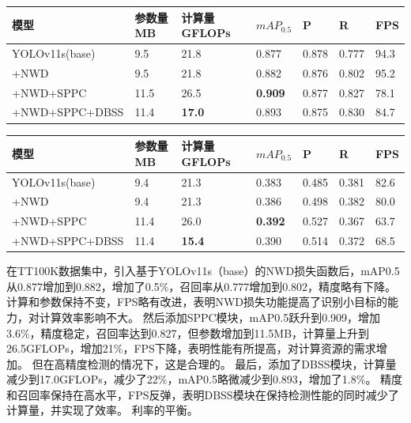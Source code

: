 \begin{table}[htbp]
    \centering
    \captionsetup{font=footnotesize}
    \label{tab:ablation_studies_tt100k}
    \begin{tabular}{p{}p{}p{}p{}p{}p{}p{}}
        \toprule
        模型       & 参数量 MB & 计算量 GFLOPs & $mAP_{0.5}$   & P     & R     & FPS \\ 
        \midrule
        YOLOv11s(base) & 9.5           & 21.8         & 0.877          & 0.878  & 0.777 & 94.3 \\
        +NWD           & 9.5           & 21.8         & 0.882          & 0.876  & 0.802 & 95.2 \\
        +NWD+SPPC      & 11.5          & 26.5         & \textbf{0.909} & 0.877  & 0.827 & 78.1 \\
        +NWD+SPPC+DBSS & 11.4          & \textbf{17.0} & 0.893          & 0.875  & 0.830 & 84.7 \\
        \bottomrule
    \end{tabular}
\end{table}

\begin{table}[htbp]
    \centering
    \captionsetup{font=footnotesize}
    \label{tab:ablation_studies_vd}
    \begin{tabular}{p{}p{}p{}p{}p{}p{}p{}}
        \toprule
        模型       & 参数量 MB & 计算量 GFLOPs & $mAP_{0.5}$   & P     & R     & FPS \\ 
        \midrule
        YOLOv11s(base) & 9.4           & 21.3          & 0.383          & 0.485  & 0.381 & 82.6 \\
        +NWD           & 9.4           & 21.3          & 0.386          & 0.498  & 0.382 & 80.0 \\
        +NWD+SPPC      & 11.4          & 26.0          & \textbf{0.392} & 0.527  & 0.367 & 63.7 \\
        +NWD+SPPC+DBSS & 11.4          & \textbf{15.4} & 0.390 & 0.514  & 0.372 & 68.5 \\
        \bottomrule
    \end{tabular}
\end{table}

在TT100K数据集中，引入基于YOLOv11s（base）的NWD损失函数后，mAP0.5从0.877增加到0.882，增加了0.5\%，召回率从0.777增加到0.802，精度略有下降。 计算和参数保持不变，FPS略有改进，表明NWD损失功能提高了识别小目标的能力，对计算效率影响不大。 然后添加SPPC模块，mAP0.5跃升到0.909，增加3.6\%，精度稳定，召回率达到0.827，但参数增加到11.5MB，计算量上升到26.5GFLOPs，增加21\%，FPS下降，表明性能有所提高，对计算资源的需求增加。 但在高精度检测的情况下，这是合理的。 最后，添加了DBSS模块，计算量减少到17.0GFLOPs，减少了22\%，mAP0.5略微减少到0.893，增加了1.8\%。 精度和召回率保持在高水平，FPS反弹，表明DBSS模块在保持检测性能的同时减少了计算量，并实现了效率。 利率的平衡。

